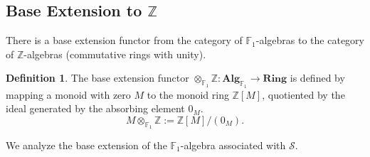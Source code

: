 \documentclass[11pt, a4paper]{article}
\theoremstyle{plain}
\theoremstyle{definition}
\newtheorem{definition}[theorem]{Definition}
\numberwithin{equation}{section}
\newcommand{\Z}{\mathbb{Z}}
\newcommand{\SemiringS}{\mathcal{S}}
\newcommand{\FOne}{\mathbb{F}_1}
\newcommand{\Rng}{\mathbf{Ring}}
\begin{document}
\subsection{Base Extension to \texorpdfstring{$\Z$}{Z}}

There is a base extension functor from the category of $\FOne$-algebras to the category of $\Z$-algebras (commutative rings with unity).

\begin{definition}
The base extension functor $\otimes_{\FOne} \Z: \mathbf{Alg}_{\FOne} \to \Rng$ is defined by mapping a monoid with zero $M$ to the monoid ring $\Z[M]$, quotiented by the ideal generated by the absorbing element $0_M$.
\begin{equation}
    M \otimes_{\FOne} \Z := \Z[M] / (0_M).
\end{equation}
\end{definition}

We analyze the base extension of the $\FOne$-algebra associated with $\SemiringS$.
\end{document}
